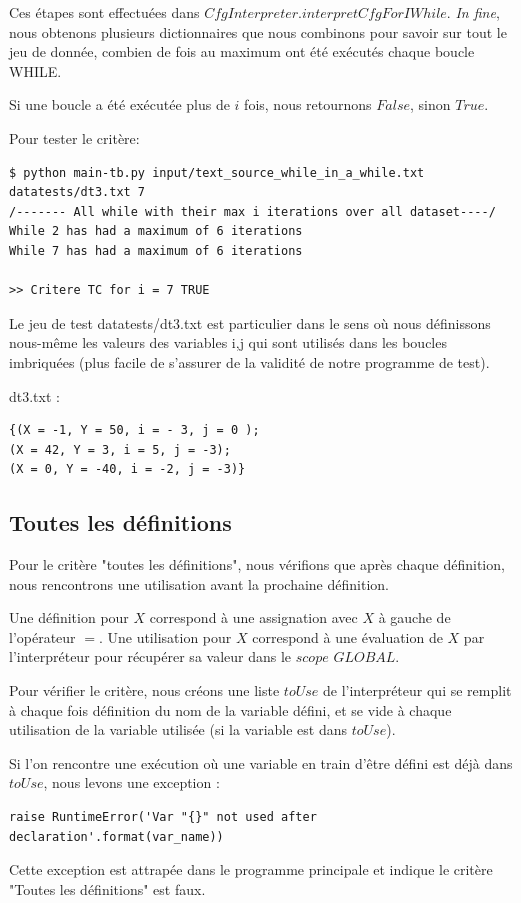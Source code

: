\documentclass[a4paper]{article}
\begin{document}
Ces étapes sont effectuées dans $CfgInterpreter.interpretCfgForIWhile$. 
\textit{In fine}, nous obtenons plusieurs dictionnaires que nous combinons pour savoir sur tout le jeu de donnée, combien de fois au maximum ont été exécutés chaque boucle WHILE.

Si une boucle a été exécutée plus de $i$ fois, nous retournons $False$, sinon $True$.

Pour tester le critère:
\begin{verbatim}
$ python main-tb.py input/text_source_while_in_a_while.txt datatests/dt3.txt 7
/------- All while with their max i iterations over all dataset----/
While 2 has had a maximum of 6 iterations
While 7 has had a maximum of 6 iterations

>> Critere TC for i = 7 TRUE
\end{verbatim}

Le jeu de test datatests/dt3.txt est particulier dans le sens où nous définissons nous-même les valeurs des variables i,j qui sont utilisés dans les boucles imbriquées (plus facile de s'assurer de la validité de notre programme de test). 

dt3.txt : 
\begin{verbatim}
{(X = -1, Y = 50, i = - 3, j = 0 );
(X = 42, Y = 3, i = 5, j = -3);
(X = 0, Y = -40, i = -2, j = -3)}
\end{verbatim}

\subsection{Toutes les définitions}

Pour le critère "toutes les définitions", nous vérifions que après chaque définition, nous rencontrons une utilisation avant la prochaine définition.

Une définition pour $X$ correspond à une assignation avec $X$ à gauche de l'opérateur $=$. 
Une utilisation pour $X$ correspond à une évaluation de $X$ par l'interpréteur pour récupérer sa valeur dans le $scope$ $GLOBAL$. 

Pour vérifier le critère, nous créons une liste $toUse$ de l'interpréteur qui se remplit à chaque fois définition du nom de la variable défini, et se vide à chaque utilisation de la variable utilisée (si la variable est dans $toUse$). 

Si l'on rencontre une exécution où une variable en train d'être défini est déjà dans $toUse$, nous levons une exception :
\begin{verbatim}
raise RuntimeError('Var "{}" not used after declaration'.format(var_name))
\end{verbatim}
Cette exception est attrapée dans le programme principale et indique le critère "Toutes les définitions" est faux. 
\end{document}

